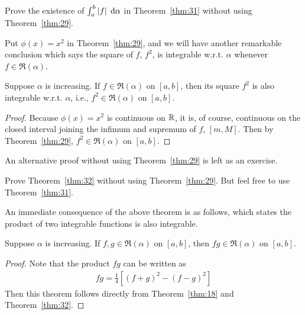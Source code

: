 \documentclass[thmcnt=section, 12pt]{my-elegantbook}
\begin{document}
\begin{exercise}
    Prove the existence of $\int_a^b \left\lvert f \right\rvert \; \mathrm{d}\alpha$ in Theorem~\ref{thm:31} without using Theorem~\ref{thm:29}.
\end{exercise}

\begin{solution}
\end{solution}


Put $\phi(x) = x^2$ in Theorem~\ref{thm:29}, and we will have another remarkable conclusion which says the square of $f$, $f^2$, is integrable w.r.t. $\alpha$ whenever $f \in \mathfrak{R}(\alpha)$.

\begin{theorem} \label{thm:32}
    Suppose $\alpha$ is increasing. If $f \in \mathfrak{R}(\alpha)$ on $[a, b]$, then its square $f^2$ is also integrable w.r.t. $\alpha$, i.e., $f^2 \in \mathfrak{R}(\alpha)$ on $[a, b]$.
\end{theorem}

\begin{proof}
    Because $\phi(x) = x^2$ is continuous on $\mathbb{R}$, it is, of course, continuous on the closed interval joining the infimum and supremum of $f$, $[m, M]$. Then by Theorem~\ref{thm:29}, $f^2 \in \mathfrak{R}(\alpha)$ on $[a, b]$.
\end{proof}

An alternative proof without using Theorem~\ref{thm:29} is left as an exercise.

\begin{exercise}
    Prove Theorem~\ref{thm:32} without using Theorem~\ref{thm:29}. But feel free to use Theorem~\ref{thm:31}.
\end{exercise}

\begin{solution}
\end{solution}


An immediate consequence of the above theorem is as follows, which states the product of two integrable functions is also integrable.

\begin{theorem} \label{thm:38}
    Suppose $\alpha$ is increasing. If $f, g \in \mathfrak{R}(\alpha)$ on $[a, b]$, then $fg \in \mathfrak{R}(\alpha)$ on $[a, b]$.
\end{theorem}

\begin{proof}
    Note that the product $fg$ can be written as
    \begin{align*}
        f g = \frac{1}{4} [
            (f + g)^2 - (f - g)^2
        ]
    \end{align*}
    Then this theorem follows directly from Theorem~\ref{thm:18} and Theorem~\ref{thm:32}.
\end{proof}
\end{document}
